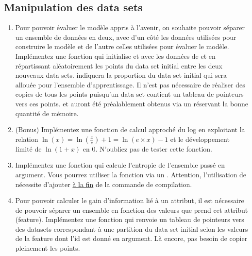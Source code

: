 \documentclass[a4paper, 10pt]{article}
\begin{document}
\subsection{Manipulation des data sets}
\begin{enumerate}
\item Pour pouvoir évaluer le modèle appris à l'avenir, on souhaite pouvoir séparer un ensemble de données en deux, avec d'un côté les données utilisées pour construire le modèle et de l'autre celles utilisées pour évaluer le modèle. Implémentez une fonction  qui initialise  et  avec les données de  et en répartissant aléatoirement les points du data set initial entre les deux nouveaux data sets.  indiquera la proportion du data set initial qui sera allouée pour l'ensemble d'apprentissage. Il n'est pas nécessaire de réaliser des copies de tous les points puisqu'un data set contient un tableau de pointeurs vers ces points.  et  auront été préalablement obtenus via un  réservant la bonne quantité de mémoire.
\item (Bonus) Implémentez une fonction de calcul approché du log en exploitant la relation \(\ln(x) = \ln(\frac{x}{e}) + 1= \ln(e\times x) -1\) et le développement limité de \(\ln(1+x)\) en 0. N'oubliez pas de tester cette fonction.
\item Implémentez une fonction  qui calcule l'entropie de l'ensemble passé en argument. Vous pourrez utiliser la fonction  via un . Attention, l'utilisation de  nécessite d'ajouter  \underline{à la fin} de la commande de compilation.
\item Pour pouvoir calculer le gain d'information lié à un attribut, il est nécessaire de pouvoir séparer un ensemble en fonction des valeurs que prend cet attribut (feature). Implémentez une fonction  qui renvoie un tableau de pointeurs vers des datasets correspondant à une partition du data set initial selon les valeurs de la feature dont l'id est donné en argument. Là encore, pas besoin de copier pleinement les points.

\end{enumerate}
\end{document}
